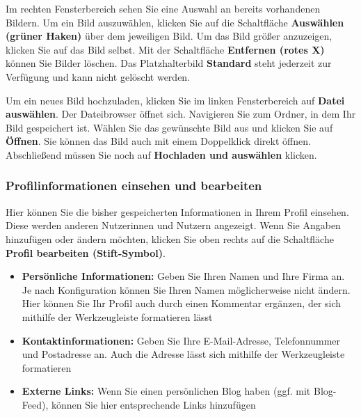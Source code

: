 \documentclass[
  letterpaper,
  DIV=11,
  numbers=noendperiod]{scrreprt}
\providecommand{\tightlist}{%
  \setlength{\itemsep}{0pt}\setlength{\parskip}{0pt}}\usepackage{longtable,booktabs,array}
\begin{document}
Im rechten Fensterbereich sehen Sie eine Auswahl an bereits vorhandenen
Bildern. Um ein Bild auszuwählen, klicken Sie auf die Schaltfläche
\textbf{Auswählen (grüner Haken)} über dem jeweiligen Bild. Um das Bild
größer anzuzeigen, klicken Sie auf das Bild selbst. Mit der Schaltfläche
\textbf{Entfernen (rotes X)} können Sie Bilder löschen. Das
Platzhalterbild \textbf{Standard} steht jederzeit zur Verfügung und kann
nicht gelöscht werden.

Um ein neues Bild hochzuladen, klicken Sie im linken Fensterbereich auf
\textbf{Datei auswählen}. Der Dateibrowser öffnet sich. Navigieren Sie
zum Ordner, in dem Ihr Bild gespeichert ist. Wählen Sie das gewünschte
Bild aus und klicken Sie auf \textbf{Öffnen}. Sie können das Bild auch
mit einem Doppelklick direkt öffnen. Abschließend müssen Sie noch auf
\textbf{Hochladen und auswählen} klicken.

\subsubsection{Profilinformationen einsehen und
bearbeiten}\label{profilinformationen-einsehen-und-bearbeiten}

Hier können Sie die bisher gespeicherten Informationen in Ihrem Profil
einsehen. Diese werden anderen Nutzerinnen und Nutzern angezeigt. Wenn
Sie Angaben hinzufügen oder ändern möchten, klicken Sie oben rechts auf
die Schaltfläche \textbf{Profil bearbeiten (Stift-Symbol)}.

\begin{itemize}
\tightlist
\item
  \textbf{Persönliche Informationen:} Geben Sie Ihren Namen und Ihre
  Firma an. Je nach Konfiguration können Sie Ihren Namen möglicherweise
  nicht ändern. Hier können Sie Ihr Profil auch durch einen Kommentar
  ergänzen, der sich mithilfe der Werkzeugleiste formatieren lässt
\item
  \textbf{Kontaktinformationen:} Geben Sie Ihre E-Mail-Adresse,
  Telefonnummer und Postadresse an. Auch die Adresse lässt sich mithilfe
  der Werkzeugleiste formatieren
\item
  \textbf{Externe Links:} Wenn Sie einen persönlichen Blog haben (ggf.
  mit Blog-Feed), können Sie hier entsprechende Links hinzufügen
\end{itemize}
\end{document}
